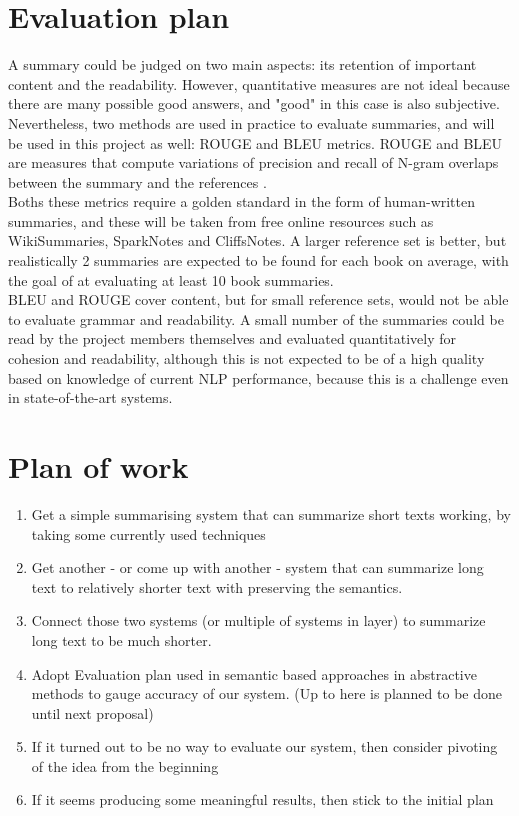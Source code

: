 \section{Evaluation plan}
A summary could be judged on two main aspects: its retention of important content and the readability. However, quantitative measures are not ideal because there are many possible good answers, and "good" in this case is also subjective. Nevertheless, two methods are used in practice to evaluate summaries, and will be used in this project as well: ROUGE and BLEU metrics. ROUGE and BLEU are measures that compute variations of precision and recall of N-gram overlaps between the summary and the references \cite{nenkova2006summarization} \cite{lin2004rouge}. \\
Boths these metrics require a golden standard in the form of human-written summaries, and these will be taken from free online resources such as WikiSummaries, SparkNotes and CliffsNotes. A larger reference set is better, but realistically 2 summaries are expected to be found for each book on average, with the goal of at evaluating at least 10 book summaries. \\
BLEU and ROUGE cover content, but for small reference sets, would not be able to evaluate grammar and readability. A small number of the summaries could be read by the project members themselves and evaluated quantitatively for cohesion and readability, although this is not expected to be of a high quality based on knowledge of current NLP performance, because this is a challenge even in state-of-the-art systems.

\section{Plan of work}

\begin{enumerate}
  \item Get a simple summarising system that can summarize short texts working, by taking some currently used techniques
  \item Get another - or come up with another - system that can summarize long text to relatively shorter text with preserving the semantics.
  \item Connect those two systems (or multiple of systems in layer) to summarize long text to be much shorter.
  \item Adopt Evaluation plan used in semantic based approaches in abstractive methods to gauge accuracy of our system. (Up to here is planned to be done until next proposal)
  \item If it turned out to be no way to evaluate our system, then consider pivoting of the idea from the beginning
  \item If it seems producing some meaningful results, then stick to the initial plan
\end{enumerate}

